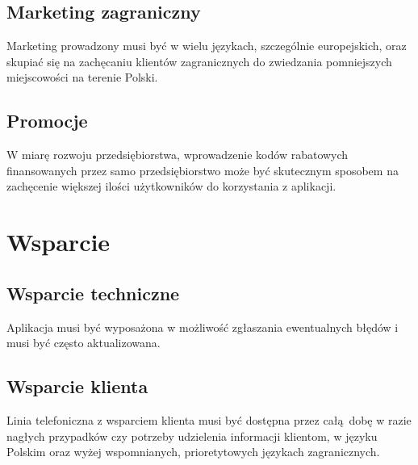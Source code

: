 \subsection{Marketing zagraniczny}
Marketing prowadzony musi być w wielu językach, szczególnie europejskich, oraz skupiać się na zachęcaniu klientów zagranicznych do zwiedzania pomniejszych miejscowości na terenie Polski.

\subsection{Promocje}
W miarę rozwoju przedsiębiorstwa, wprowadzenie kodów rabatowych finansowanych przez samo przedsiębiorstwo może być skutecznym sposobem na zachęcenie większej ilości użytkowników do korzystania z aplikacji.

\section{Wsparcie}
\subsection{Wsparcie techniczne}
Aplikacja musi być wyposażona w możliwość zgłaszania ewentualnych błędów i musi być często aktualizowana.

\subsection{Wsparcie klienta}
Linia telefoniczna z wsparciem klienta musi być dostępna przez całą dobę w razie nagłych przypadków czy potrzeby udzielenia informacji klientom, w języku Polskim oraz wyżej wspomnianych, prioretytowych językach zagranicznych.